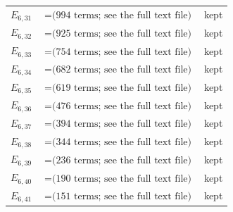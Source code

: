 \documentclass[10pt]{article}
\begin{document}
\begin{longtable}{r>{\raggedright\arraybackslash}p{}>{\raggedright\arraybackslash}p{}}
$E_{6,31}$ & $= \text{(994 terms; see the full text file)}$ & kept \\
$E_{6,32}$ & $= \text{(925 terms; see the full text file)}$ & kept \\
$E_{6,33}$ & $= \text{(754 terms; see the full text file)}$ & kept \\
$E_{6,34}$ & $= \text{(682 terms; see the full text file)}$ & kept \\
$E_{6,35}$ & $= \text{(619 terms; see the full text file)}$ & kept \\
$E_{6,36}$ & $= \text{(476 terms; see the full text file)}$ & kept \\
$E_{6,37}$ & $= \text{(394 terms; see the full text file)}$ & kept \\
$E_{6,38}$ & $= \text{(344 terms; see the full text file)}$ & kept \\
$E_{6,39}$ & $= \text{(236 terms; see the full text file)}$ & kept \\
$E_{6,40}$ & $= \text{(190 terms; see the full text file)}$ & kept \\
$E_{6,41}$ & $= \text{(151 terms; see the full text file)}$ & kept \\

\end{longtable}
\end{document}
